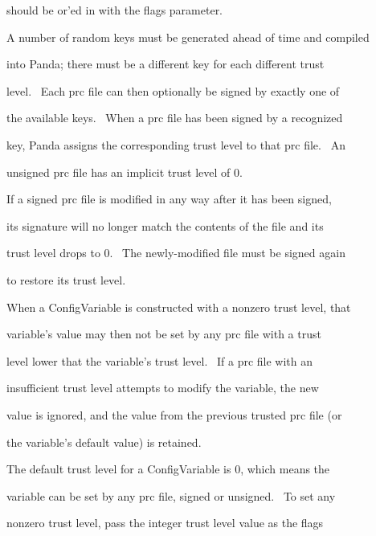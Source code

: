 \documentclass[a4paper]{article}
\begin{document}
{\color{black}
should be or'ed in with the flags parameter.}


\bigskip

{\color{black}
A number of random keys must be generated ahead of time and compiled}

{\color{black}
into Panda; there must be a different key for each different trust}

{\color{black}
level. \ Each prc file can then optionally be signed by exactly one of}

{\color{black}
the available keys. \ When a prc file has been signed by a recognized}

{\color{black}
key, Panda assigns the corresponding trust level to that prc file. \ An}

{\color{black}
unsigned prc file has an implicit trust level of 0.}


\bigskip

{\color{black}
If a signed prc file is modified in any way after it has been signed,}

{\color{black}
its signature will no longer match the contents of the file and its}

{\color{black}
trust level drops to 0. \ The newly-modified file must be signed again}

{\color{black}
to restore its trust level.}


\bigskip

{\color{black}
When a ConfigVariable is constructed with a nonzero trust level, that}

{\color{black}
variable's value may then not be set by any prc file with a trust}

{\color{black}
level lower that the variable's trust level. \ If a prc file with an}

{\color{black}
insufficient trust level attempts to modify the variable, the new}

{\color{black}
value is ignored, and the value from the previous trusted prc file (or}

{\color{black}
the variable's default value) is retained.}


\bigskip

{\color{black}
The default trust level for a ConfigVariable is 0, which means the}

{\color{black}
variable can be set by any prc file, signed or unsigned. \ To set any}

{\color{black}
nonzero trust level, pass the integer trust level value as the flags}
\end{document}
